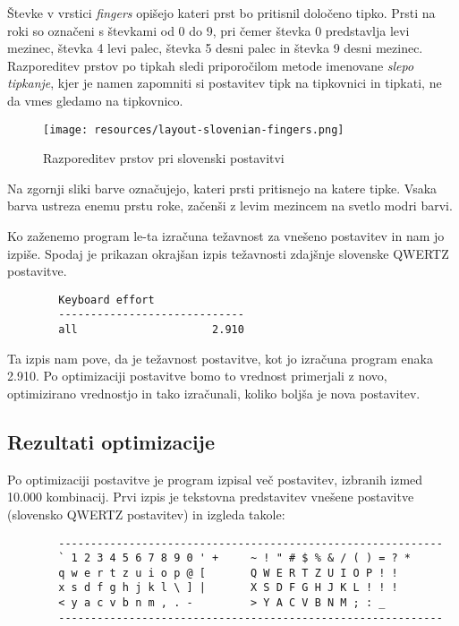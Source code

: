     Števke v vrstici \emph{fingers} opišejo kateri prst bo pritisnil določeno tipko.
    Prsti na roki so označeni s števkami od 0 do 9, pri čemer števka 0 predstavlja levi mezinec, števka 4 levi palec, števka 5 desni palec in števka 9 desni mezinec.
    Razporeditev prstov po tipkah sledi priporočilom metode imenovane \emph{slepo tipkanje}, kjer je namen zapomniti si postavitev tipk na tipkovnici in
    tipkati, ne da vmes gledamo na tipkovnico.

    \begin{figure}[h]
    \centering
    \texttt{[image: resources/layout-slovenian-fingers.png]}
    \caption{Razporeditev prstov pri slovenski postavitvi}
    \end{figure}

    Na zgornji sliki barve označujejo, kateri prsti pritisnejo na katere tipke.
    Vsaka barva ustreza enemu prstu roke, začenši z levim mezincem na svetlo modri barvi.

    Ko zaženemo program le-ta izračuna težavnost za vnešeno postavitev in nam jo izpiše.
    Spodaj je prikazan okrajšan izpis težavnosti zdajšnje slovenske QWERTZ postavitve.

    \begin{verbatim}
        Keyboard effort
        -----------------------------
        all                     2.910
    \end{verbatim}

    Ta izpis nam pove, da je težavnost postavitve, kot jo izračuna program enaka 2.910.
    Po optimizaciji postavitve bomo to vrednost primerjali z novo, optimizirano vrednostjo
    in tako izračunali, koliko boljša je nova postavitev.

    \subsection{Rezultati optimizacije}\label{subsec:rezultati-optimizacije}

    Po optimizaciji postavitve je program izpisal več postavitev, izbranih izmed 10.000 kombinacij.
    Prvi izpis je tekstovna predstavitev vnešene postavitve (slovensko QWERTZ postavitev) in izgleda takole:

    \begin{verbatim}
        ------------------------------------------------------------
        ` 1 2 3 4 5 6 7 8 9 0 ' +     ~ ! " # $ % & / ( ) = ? *
        q w e r t z u i o p @ [       Q W E R T Z U I O P ! !
        x s d f g h j k l \ ] |       X S D F G H J K L ! ! !
        < y a c v b n m , . -         > Y A C V B N M ; : _
        ------------------------------------------------------------
    \end{verbatim}

